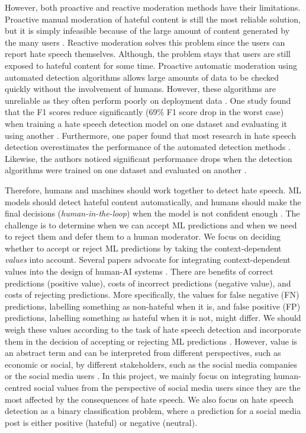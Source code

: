 %
However, both proactive and reactive moderation methods have their limitations.
%
Proactive manual moderation of hateful content is still the most reliable solution, but it is simply infeasible because of the large amount of content generated by the many users \citep{balayn2021automatic}.
%
Reactive moderation solves this problem since the users can report hate speech themselves.
%
Although, the problem stays that users are still exposed to hateful content for some time.
%
Proactive automatic moderation using automated detection algorithms allows large amounts of data to be checked quickly without the involvement of humans.
%
However, these algorithms are unreliable as they often perform poorly on deployment data \citep{balayn2021automatic, grondahl2018all, arango2019hate}.
%
One study found that the F1 scores reduce significantly (69\% F1 score drop in the worst case) when training a hate speech detection model on one dataset and evaluating it using another \citep{grondahl2018all}.
%
Furthermore, one paper found that most research in hate speech detection overestimates the performance of the automated detection methods \citep{arango2019hate}.
%
Likewise, the authors noticed significant performance drops when the detection algorithms were trained on one dataset and evaluated on another \citep{arango2019hate}.
%

%
Therefore, humans and machines should work together to detect hate speech.
%
ML models should detect hateful content automatically, and humans should make the final decisions (\textit{human-in-the-loop}) when the model is not confident enough \citep{woo2020future, hendrickx2021machine}.
%
The challenge is to determine when we can accept ML predictions and when we need to reject them and defer them to a human moderator.
%
We focus on deciding whether to accept or reject ML predictions by taking the context-dependent \emph{values} into account.
%
Several papers advocate for integrating context-dependent values into the design of human-AI systems \citep{casati2021value,sayin2021science,zhu2018value, umbrello2021mapping, cummings2006integrating}.
%
There are benefits of correct predictions (positive value), costs of incorrect predictions (negative value), and costs of rejecting predictions.
%
More specifically, the values for false negative (FN) predictions, labelling something as non-hateful when it is, and false positive (FP) predictions, labelling something as hateful when it is not, might differ.
%
We should weigh these values according to the task of hate speech detection and incorporate them in the decision of accepting or rejecting ML predictions \citep{sayin2021science}.
%
However, value is an abstract term and can be interpreted from different perspectives, such as economic or social, by different stakeholders, such as the social media companies or the social media users \citep{zhu2018value, umbrello2021mapping, cummings2006integrating}.
%
In this project, we mainly focus on integrating human-centred social values from the perspective of social media users since they are the most affected by the consequences of hate speech.
%
We also focus on hate speech detection as a binary classification problem, where a prediction for a social media post is either positive (hateful) or negative (neutral).
%

